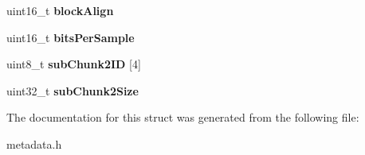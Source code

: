 \begin{DoxyCompactItemize}
\item 
\mbox{\label{structMETADATA__H_a1ccedbb9925f18d77d5fba5a550c6847}} 
uint16\+\_\+t {\bfseries block\+Align}
\item 
\mbox{\label{structMETADATA__H_ad3bb15a883e96bad9a484ab6675d73ae}} 
uint16\+\_\+t {\bfseries bits\+Per\+Sample}
\item 
\mbox{\label{structMETADATA__H_a452010ab4a3f5cb9a4ca9f8298b3b555}} 
uint8\+\_\+t {\bfseries sub\+Chunk2\+ID} \mbox{[}4\mbox{]}
\item 
\mbox{\label{structMETADATA__H_ad06eed2a8beff07021480590e3ea6ea4}} 
uint32\+\_\+t {\bfseries sub\+Chunk2\+Size}
\end{DoxyCompactItemize}


The documentation for this struct was generated from the following file\+:\begin{DoxyCompactItemize}
\item 
metadata.\+h\end{DoxyCompactItemize}
